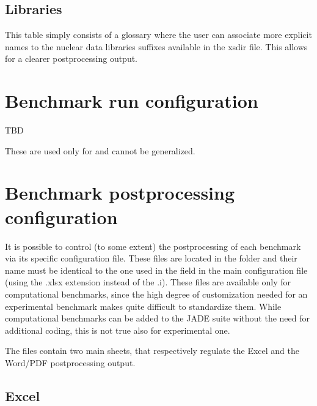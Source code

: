 \documentclass[letterpaper,10pt,english]{sphinxmanual}
\let\sphinxpxdimen\pdfpxdimen\else\newdimen\sphinxpxdimen
\begin{document}
\subsection{Libraries}
\label{\detokenize{usage/configuration:libraries}}
\noindent\sphinxincludegraphics[width=400\sphinxpxdimen]{{lib}.png}

This table simply consists of a glossary where the user can associate more explicit
names to the nuclear data libraries suffixes available in the xsdir file. This
allows for a clearer post\sphinxhyphen{}processing output.


\section{Benchmark run configuration}
\label{\detokenize{usage/configuration:benchmark-run-configuration}}\label{\detokenize{usage/configuration:runconf}}
TBD

These are used only for  and cannot be generalized.


\section{Benchmark post\sphinxhyphen{}processing configuration}
\label{\detokenize{usage/configuration:benchmark-post-processing-configuration}}\label{\detokenize{usage/configuration:ppconf}}
It is possible to control (to some extent) the post\sphinxhyphen{}processing of each benchmark via its
specific configuration file. These files are located in the 
folder and their name must be identical to the one used in the  field in the main configuration file
(using the .xlsx extension instead of the .i). These files are available only for computational benchmarks,
since the high degree of customization needed for an experimental benchmark makes quite difficult to
standardize them. While computational benchmarks can be added to the JADE suite without the need for additional
coding, this is not true also for experimental one.

The files contain two main sheets, that respectively regulate the Excel and the Word/PDF post\sphinxhyphen{}processing output.


\subsection{Excel}
\label{\detokenize{usage/configuration:excel}}
\noindent\sphinxincludegraphics[width=600\sphinxpxdimen]{{excelbench}.png}
\end{document}
